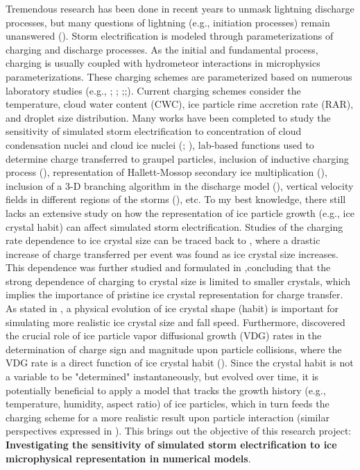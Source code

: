 Tremendous research has been done in recent years to unmask lightning discharge processes, but many questions of lightning (e.g., initiation processes) remain unanswered (\cite{mazur2016lightning}). Storm electrification is modeled through parameterizations of charging and discharge processes. As the initial and fundamental process, charging is usually coupled with hydrometeor interactions in microphysics parameterizations. These charging schemes are parameterized based on numerous laboratory studies (e.g., \cite{reynolds1957thunderstorm}; \cite{takahashi1978riming}; \cite{jayaratne1983laboratory};\cite{saunders1991effect};\cite{saunders1998laboratory}). Current charging schemes consider the temperature, cloud water content (CWC), ice particle rime accretion rate (RAR), and droplet size distribution. Many works have been completed to study the sensitivity of simulated storm electrification to concentration of cloud condensation nuclei and cloud ice nuclei (\cite{takahashi1984thunderstorm}; \cite{mansell2013aerosol}), lab-based functions used to determine charge transferred to graupel particles, inclusion of inductive charging process (\cite{mansell2005charge}), representation of Hallett-Mossop secondary ice multiplication (\cite{mansell2013aerosol}), inclusion of a 3-D branching algorithm in the discharge model (\cite{barthe2007simulation}), vertical velocity fields in different regions of the storms (\cite{wang2015impact}), etc. To my best knowledge, there still lacks an extensive study on how the representation of ice particle growth (e.g., ice crystal habit) can affect simulated storm electrification. Studies of the charging rate dependence to ice crystal size can be traced back to \cite{jayaratne1983laboratory}, where a drastic increase of charge transferred per event was found as ice crystal size increases. This dependence was further studied and formulated in \cite{keith1989charge,
keith1990further},concluding that the strong dependence of charging to crystal size is limited to smaller crystals, which implies the importance of pristine ice crystal representation for charge transfer. As stated in \cite{harrington2013methoda,harrington2013methodb}, a physical evolution of ice crystal shape (habit) is important for simulating more realistic ice crystal size and fall speed. Furthermore, \cite{baker1987influence} discovered the crucial role of ice particle vapor diffusional growth (VDG) rates in the determination of charge sign and magnitude upon particle collisions, where the VDG rate is a direct function of ice crystal habit (\cite{sulia2011ice}). Since the crystal habit is not a variable to be "determined" instantaneously, but evolved over time, it is potentially beneficial to apply a model that tracks the growth history (e.g., temperature, humidity, aspect ratio) of ice particles, which in turn feeds the charging scheme for a more realistic result upon particle interaction (similar perspectives expressed in \cite{keith1990further}). This brings out the objective of this research project: \textbf{Investigating the sensitivity of simulated storm electrification to ice microphysical representation in numerical models}.
